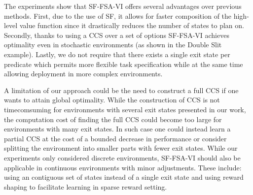 The experiments show that SF-FSA-VI offers several advantages over previous methods. First, due to the use of SF, it allows for faster composition of the high-level value function since it drastically reduces the number of states to plan on. Secondly, thanks to using a CCS over a set of options SF-FSA-VI achieves optimality even in stochastic environments (as shown in the Double Slit example). Lastly, we do not require that there exists a single exit state per predicate which permits more flexible task specification while at the same time allowing deployment in more complex environments. 

A limitation of our approach could be the need to construct a full CCS if one wants to attain global optimality. While the construction of CCS is not timecomsuming for environments with several exit states presented in our work, the computation cost of finding the full CCS could become too large for environments with many exit states. In such case one could instead learn a partial CCS at the cost of a bounded decrease in performance \citep{Alegre2022} or consider splitting the environment into smaller parts with fewer exit states. While our experiments only considered discrete environments, SF-FSA-VI should also be applicable in continuous environments with minor adjustments. These include: using an contiguous set of states instead of a single exit state and using reward shaping to facilitate learning in sparse reward setting.
